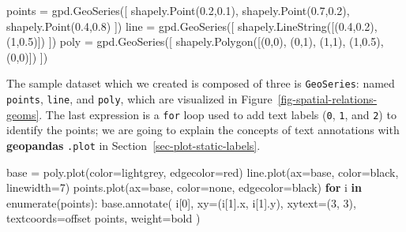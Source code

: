 \documentclass[
  letterpaper,
]{krantz}
\newenvironment{Shaded}{\begin{snugshade}}{\end{snugshade}}
\newcommand{\BuiltInTok}[1]{\textcolor[rgb]{0.00,0.23,0.31}{#1}}
\newcommand{\ControlFlowTok}[1]{\textcolor[rgb]{0.00,0.23,0.31}{\textbf{#1}}}
\newcommand{\DecValTok}[1]{\textcolor[rgb]{0.68,0.00,0.00}{#1}}
\newcommand{\FloatTok}[1]{\textcolor[rgb]{0.68,0.00,0.00}{#1}}
\newcommand{\KeywordTok}[1]{\textcolor[rgb]{0.00,0.23,0.31}{\textbf{#1}}}
\newcommand{\NormalTok}[1]{\textcolor[rgb]{0.00,0.23,0.31}{#1}}
\newcommand{\OperatorTok}[1]{\textcolor[rgb]{0.37,0.37,0.37}{#1}}
\newcommand{\StringTok}[1]{\textcolor[rgb]{0.13,0.47,0.30}{#1}}
\begin{document}
\begin{Shaded}
\begin{Highlighting}[]
\NormalTok{points }\OperatorTok{=}\NormalTok{ gpd.GeoSeries([}
\NormalTok{  shapely.Point(}\FloatTok{0.2}\NormalTok{,}\FloatTok{0.1}\NormalTok{), }
\NormalTok{  shapely.Point(}\FloatTok{0.7}\NormalTok{,}\FloatTok{0.2}\NormalTok{), }
\NormalTok{  shapely.Point(}\FloatTok{0.4}\NormalTok{,}\FloatTok{0.8}\NormalTok{)}
\NormalTok{])}
\NormalTok{line }\OperatorTok{=}\NormalTok{ gpd.GeoSeries([}
\NormalTok{  shapely.LineString([(}\FloatTok{0.4}\NormalTok{,}\FloatTok{0.2}\NormalTok{), (}\DecValTok{1}\NormalTok{,}\FloatTok{0.5}\NormalTok{)])}
\NormalTok{])}
\NormalTok{poly }\OperatorTok{=}\NormalTok{ gpd.GeoSeries([}
\NormalTok{  shapely.Polygon([(}\DecValTok{0}\NormalTok{,}\DecValTok{0}\NormalTok{), (}\DecValTok{0}\NormalTok{,}\DecValTok{1}\NormalTok{), (}\DecValTok{1}\NormalTok{,}\DecValTok{1}\NormalTok{), (}\DecValTok{1}\NormalTok{,}\FloatTok{0.5}\NormalTok{), (}\DecValTok{0}\NormalTok{,}\DecValTok{0}\NormalTok{)])}
\NormalTok{])}
\end{Highlighting}
\end{Shaded}

The sample dataset which we created is composed of three is
\texttt{GeoSeries}: named \texttt{points}, \texttt{line}, and
\texttt{poly}, which are visualized in
Figure~\ref{fig-spatial-relations-geoms}. The last expression is a
\texttt{for} loop used to add text labels (\texttt{0}, \texttt{1}, and
\texttt{2}) to identify the points; we are going to explain the concepts
of text annotations with \textbf{geopandas} \texttt{.plot} in
Section~\ref{sec-plot-static-labels}.

\begin{Shaded}
\begin{Highlighting}[]
\NormalTok{base }\OperatorTok{=}\NormalTok{ poly.plot(color}\OperatorTok{=}\StringTok{\textquotesingle{}lightgrey\textquotesingle{}}\NormalTok{, edgecolor}\OperatorTok{=}\StringTok{\textquotesingle{}red\textquotesingle{}}\NormalTok{)}
\NormalTok{line.plot(ax}\OperatorTok{=}\NormalTok{base, color}\OperatorTok{=}\StringTok{\textquotesingle{}black\textquotesingle{}}\NormalTok{, linewidth}\OperatorTok{=}\DecValTok{7}\NormalTok{)}
\NormalTok{points.plot(ax}\OperatorTok{=}\NormalTok{base, color}\OperatorTok{=}\StringTok{\textquotesingle{}none\textquotesingle{}}\NormalTok{, edgecolor}\OperatorTok{=}\StringTok{\textquotesingle{}black\textquotesingle{}}\NormalTok{)}
\ControlFlowTok{for}\NormalTok{ i }\KeywordTok{in} \BuiltInTok{enumerate}\NormalTok{(points):}
\NormalTok{    base.annotate(}
\NormalTok{        i[}\DecValTok{0}\NormalTok{], xy}\OperatorTok{=}\NormalTok{(i[}\DecValTok{1}\NormalTok{].x, i[}\DecValTok{1}\NormalTok{].y), }
\NormalTok{        xytext}\OperatorTok{=}\NormalTok{(}\DecValTok{3}\NormalTok{, }\DecValTok{3}\NormalTok{), textcoords}\OperatorTok{=}\StringTok{\textquotesingle{}offset points\textquotesingle{}}\NormalTok{, weight}\OperatorTok{=}\StringTok{\textquotesingle{}bold\textquotesingle{}}
\NormalTok{    )}
\end{Highlighting}
\end{Shaded}
\end{document}
